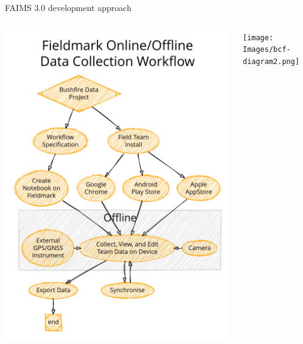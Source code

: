 \begin{frame}{FAIMS 3.0 development approach}


\vfill
\begin{columns}[T]

\begin{column}{0.3\textwidth}
\centering
\includegraphics[width=\textwidth]{Images/bcf-diagram1.png}
\end{column}
\begin{column}{0.53\textwidth}
\centering
\texttt{[image: Images/bcf-diagram2.png]} 
\end{column}

\end{columns}


\end{frame}
